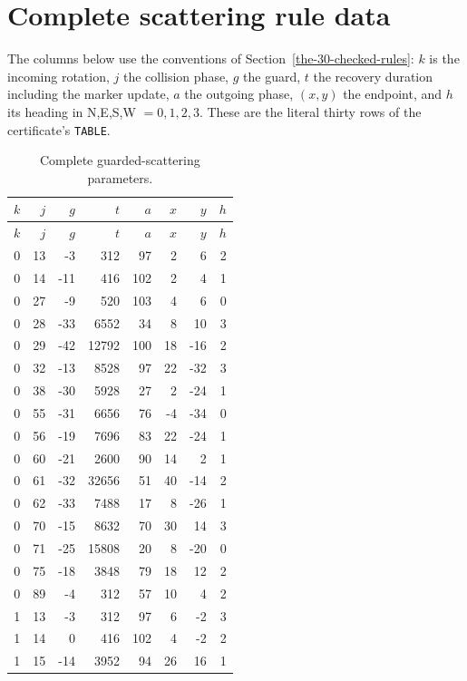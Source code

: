 \documentclass[11pt]{article}
\begin{document}
\section{Complete scattering rule data}\label{app:scattering-table}
The columns below use the conventions of Section~\ref{the-30-checked-rules}:
$k$ is the incoming rotation, $j$ the collision phase, $g$ the guard,
$t$ the recovery duration including the marker update, $a$ the outgoing
phase, $(x,y)$ the endpoint, and $h$ its heading in N,E,S,W $=0,1,2,3$.
These are the literal thirty rows of the certificate's \texttt{TABLE}.
\begin{center}\small
\begin{longtable}{rrrrrrrr}
\caption{Complete guarded-scattering parameters.}\label{tab:scattering-data}\\
\toprule $k$ & $j$ & $g$ & $t$ & $a$ & $x$ & $y$ & $h$ \\ \midrule
\endfirsthead
\toprule $k$ & $j$ & $g$ & $t$ & $a$ & $x$ & $y$ & $h$ \\ \midrule
\endhead
0 & 13 & -3 & 312 & 97 & 2 & 6 & 2 \\
0 & 14 & -11 & 416 & 102 & 2 & 4 & 1 \\
0 & 27 & -9 & 520 & 103 & 4 & 6 & 0 \\
0 & 28 & -33 & 6552 & 34 & 8 & 10 & 3 \\
0 & 29 & -42 & 12792 & 100 & 18 & -16 & 2 \\
0 & 32 & -13 & 8528 & 97 & 22 & -32 & 3 \\
0 & 38 & -30 & 5928 & 27 & 2 & -24 & 1 \\
0 & 55 & -31 & 6656 & 76 & -4 & -34 & 0 \\
0 & 56 & -19 & 7696 & 83 & 22 & -24 & 1 \\
0 & 60 & -21 & 2600 & 90 & 14 & 2 & 1 \\
0 & 61 & -32 & 32656 & 51 & 40 & -14 & 2 \\
0 & 62 & -33 & 7488 & 17 & 8 & -26 & 1 \\
0 & 70 & -15 & 8632 & 70 & 30 & 14 & 3 \\
0 & 71 & -25 & 15808 & 20 & 8 & -20 & 0 \\
0 & 75 & -18 & 3848 & 79 & 18 & 12 & 2 \\
0 & 89 & -4 & 312 & 57 & 10 & 4 & 2 \\
1 & 13 & -3 & 312 & 97 & 6 & -2 & 3 \\
1 & 14 & 0 & 416 & 102 & 4 & -2 & 2 \\
1 & 15 & -14 & 3952 & 94 & 26 & 16 & 1 \\

\end{longtable}
\end{center}
\end{document}
